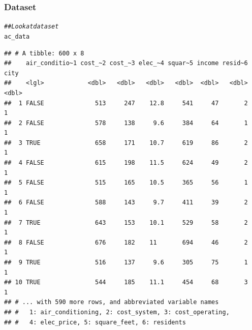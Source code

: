 \documentclass{beamer}\usepackage[]{graphicx}\usepackage[]{xcolor}
\makeatletter
\newcommand{\hlcom}[1]{\textcolor[rgb]{0.678,0.584,0.686}{\textit{#1}}}%
\newcommand{\hlstd}[1]{\textcolor[rgb]{0.345,0.345,0.345}{#1}}%
\newenvironment{kframe}{%
 \def\at@end@of@kframe{}%
 \ifinner\ifhmode%
  \def\at@end@of@kframe{\end{minipage}}%
  \begin{minipage}{\columnwidth}%
 \fi\fi%
 \def\FrameCommand##1{\hskip\@totalleftmargin \hskip-\fboxsep
 \colorbox{shadecolor}{##1}\hskip-\fboxsep
     \hskip-\linewidth \hskip-\@totalleftmargin \hskip\columnwidth}%
 \MakeFramed {\advance\hsize-\width
   \@totalleftmargin\z@ \linewidth\hsize
   \@setminipage}}%
 {\par\unskip\endMakeFramed%
 \at@end@of@kframe}
\newenvironment{knitrout}{}{} %
\makeatother
\begin{document}
\begin{frame}[fragile]\frametitle{Dataset}
\begin{knitrout}\footnotesize
{}\color{fgcolor}\begin{kframe}
\begin{alltt}
\hlcom{## Look at dataset}
\hlstd{ac_data}
\end{alltt}
\begin{verbatim}
## # A tibble: 600 x 8
##    air_conditio~1 cost_~2 cost_~3 elec_~4 squar~5 income resid~6  city
##    <lgl>            <dbl>   <dbl>   <dbl>   <dbl>  <dbl>   <dbl> <dbl>
##  1 FALSE              513     247    12.8     541     47       2     1
##  2 FALSE              578     138     9.6     384     64       1     1
##  3 TRUE               658     171    10.7     619     86       2     1
##  4 FALSE              615     198    11.5     624     49       2     1
##  5 FALSE              515     165    10.5     365     56       1     1
##  6 FALSE              588     143     9.7     411     39       2     1
##  7 TRUE               643     153    10.1     529     58       2     1
##  8 FALSE              676     182    11       694     46       2     1
##  9 TRUE               516     137     9.6     305     75       1     1
## 10 TRUE               544     185    11.1     454     68       3     1
## # ... with 590 more rows, and abbreviated variable names
## #   1: air_conditioning, 2: cost_system, 3: cost_operating,
## #   4: elec_price, 5: square_feet, 6: residents
\end{verbatim}
\end{kframe}
\end{knitrout}
\end{frame}
\end{document}
